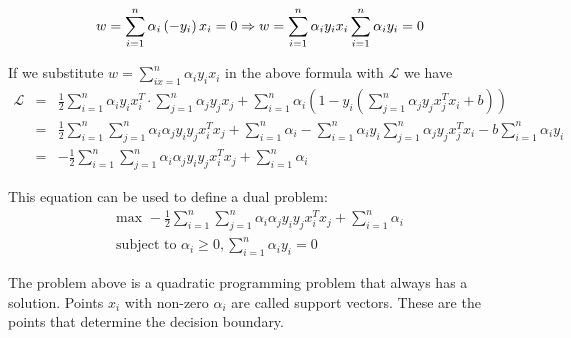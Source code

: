 \begin{equation}
w = \sum_{i=1}^{n}\alpha_i\left(-y_i\right)x_i=0 \Rightarrow w = \sum_{i=1}^{n}\alpha_i y_i x_i \\
\sum_{i=1}^{n}\alpha_i y_i=0
\end{equation}

If we substitute $w=\sum_{ix=1}^{n}\alpha_i y_i x_i$ in the above formula with $\mathcal{L}$ we have
\begin{eqnarray*}
\mathcal{L} & = &\frac{1}{2}\sum_{i=1}^{n}\alpha_iy_ix_i^T \cdot \sum_{j=1}^{n}\alpha_jy_jx_j+\sum_{i=1}^{n}\alpha_i\left(1-y_i\left(\sum_{j=1}^{n}\alpha_jy_jx_j^Tx_i+b\right)\right) \\
& = &\frac{1}{2}\sum_{i=1}^{n}\sum_{j=1}^{n}\alpha_i\alpha_j y_i y_j x_i^T x_j + \sum_{i=1}^{n}\alpha_i-\sum_{i=1}^{n}\alpha_i y_i \sum_{j=1}^{n}\alpha_j y_j x_j^T x_i -b\sum_{i=1}^{n}\alpha_i y_i \\
& = &-\frac{1}{2}\sum_{i=1}^{n}\sum_{j=1}^{n}\alpha_i\alpha_j y_i y_j x_i^T x_j + \sum_{i=1}^{n}\alpha_i
\end{eqnarray*}

This equation can be used to define a dual problem:
\begin{eqnarray*}\label{eq:svm_dual}
\textrm{max }-\frac{1}{2}\sum_{i=1}^{n}\sum_{j=1}^{n}\alpha_i\alpha_j y_i y_j x_i^T x_j + \sum_{i=1}^{n}\alpha_i \\
\textrm{subject to }\alpha_i \ge 0, \sum_{i=1}^{n} \alpha_iy_i =0
\end{eqnarray*}

The problem above is a quadratic programming problem that always has a solution. Points $x_i$ with non-zero $\alpha_i$ are called support vectors. These are the points that determine the decision boundary.

